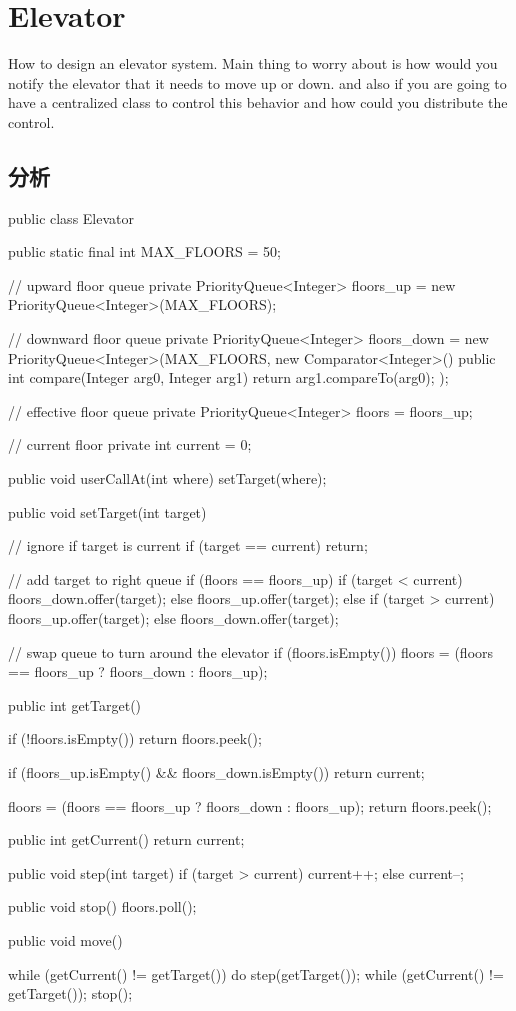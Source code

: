 \section{Elevator}
How to design an elevator system. Main thing to worry about is how would you notify the elevator that it needs to move up or down. and also if you are going to have a centralized
class to control this behavior and how could you distribute the control.

\subsection{分析}
\begin{Code}
	public class Elevator {
		
		public static final int MAX_FLOORS = 50;
		
		// upward floor queue
		private PriorityQueue<Integer> floors_up = new PriorityQueue<Integer>(MAX_FLOORS);
		
		// downward floor queue
		private PriorityQueue<Integer> floors_down = new PriorityQueue<Integer>(MAX_FLOORS, new Comparator<Integer>(){
			public int compare(Integer arg0, Integer arg1) {
				return arg1.compareTo(arg0);
			}
		});
		
		// effective floor queue
		private PriorityQueue<Integer> floors = floors_up;
		
		// current floor
		private int current = 0;
		
		public void userCallAt(int where) {
			setTarget(where);
		}
		
		public void setTarget(int target) {
			
			// ignore if target is current
			if (target == current) {
				return;
			}
			
			// add target to right queue
			if (floors == floors_up) {
				if (target < current) {
					floors_down.offer(target);
				} else {
					floors_up.offer(target);
				}
			} else {
				if (target > current) {
					floors_up.offer(target);
				} else {
					floors_down.offer(target);
				}
			}

			// swap queue to turn around the elevator
			if (floors.isEmpty()) {
				floors = (floors == floors_up ? floors_down : floors_up);
			}
		}

		public int getTarget() {
	
			if (!floors.isEmpty()) {
				return floors.peek();
			}
	
			if (floors_up.isEmpty() && floors_down.isEmpty()) {
				return current;
			}
	
			floors = (floors == floors_up ? floors_down : floors_up);
			return floors.peek();
		}

		public int getCurrent() {
			return current;
		}

		public void step(int target) {
			if (target > current) {
				current++;
			} else {
				current--;
			}
		}

		public void stop() {
			floors.poll();
		}

		public void move() {
	
			while (getCurrent() != getTarget()) {
				do {
					step(getTarget());
				} while (getCurrent() != getTarget());
				stop();
			}
		}
	}
\end{Code}


